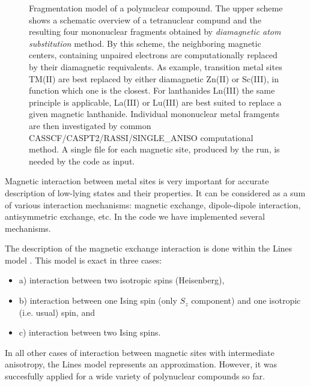 \begin{figure}
\centering
{}
\caption{Fragmentation model of a polynuclear compound. The upper scheme shows a schematic overview of a tetranuclear compund and the resulting four mononuclear fragments obtained by {\it diamagnetic atom substitution} method. By this scheme, the neighboring magnetic centers, containing unpaired electrons are computationally replaced by their diamagnetic requivalents. As example, transition metal sites TM(II) are best replaced by either diamagnetic Zn(II) or Sc(III), in function which one is the closest. For lanthanides Ln(III) the same principle is applicable, La(III) or Lu(III) are best suited to replace a given magnetic lanthanide. Individual mononuclear metal framgents are then investigated by common CASSCF/CASPT2/RASSI/SINGLE\_ANISO  computational method. A single file for each magnetic site, produced by the  run, is needed by the  code as input.}
\label{fig:fragment}
\end{figure}

Magnetic interaction between metal sites is very important for accurate description of low-lying states and their properties.
It can be considered as a sum of various interaction mechanisms: magnetic exchange, dipole-dipole interaction, antisymmetric exchange, etc.
In the  code we have implemented several mechanisms.

The description of the magnetic exchange interaction is done within the Lines model \cite{Lines1971}.
This model is exact in three cases:
\begin {itemize}
\item{ a) interaction between two isotropic spins (Heisenberg)},
\item{ b) interaction between one Ising spin (only $S_{z}$ component) and one isotropic (i.e. usual) spin}, and
\item{ c) interaction between two Ising spins.}
\end{itemize}
In all other cases of interaction between magnetic sites with intermediate anisotropy, the Lines model represents an
approximation. However, it was succesfully applied for a wide variety of polynuclear compounds so far.

